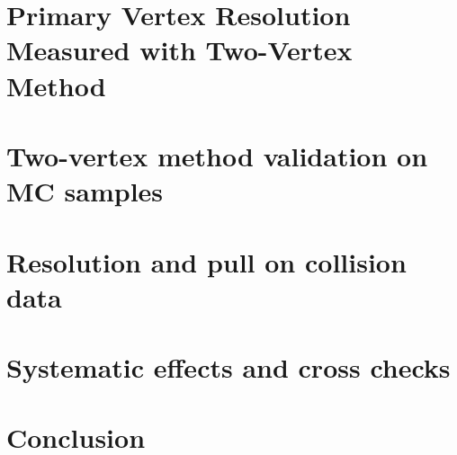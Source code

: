 \documentclass{cmspaper}
\begin{document}
\section{Primary Vertex Resolution Measured with Two-Vertex Method}
\label{sec:twovertex}


\section{Two-vertex method validation on MC samples}
\label{sec:mcvalidation}

\pagebreak

\section{Resolution and pull on collision data}
\label{sec:dataresults}

\pagebreak

\section{Systematic effects and cross checks}
\label{sec:systematics}


\section{Conclusion}
\label{sec:conclusion}




\end{document}
